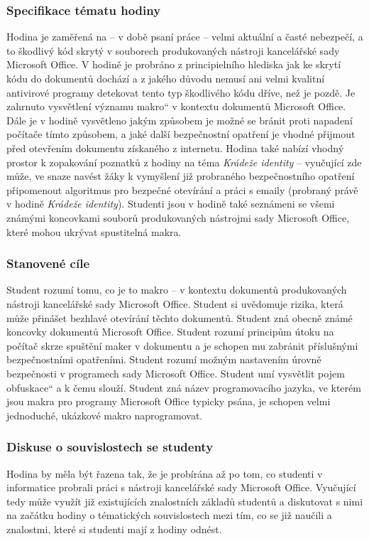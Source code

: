 \documentclass[a4paper, 12pt]{article}
\providecommand{\uv}[1]{\quotedblbase #1\textquotedblleft}
\begin{document}
\subsubsection{Specifikace tématu hodiny}
Hodina je zaměřená na -- v době psaní práce -- velmi aktuální a časté nebezpečí, a to škodlivý kód skrytý v souborech produkovaných nástroji kancelářské sady Microsoft Office. V hodině je probráno z principielního hlediska jak ke skrytí kódu do dokumentů dochází a z jakého důvodu nemusí ani velmi kvalitní antivirové programy detekovat tento typ škodlivého kódu dříve, než je pozdě. Je zahrnuto vysvětlení významu \uv{makro} v kontextu dokumentů Microsoft Office. Dále je v hodině vysvětleno jakým způsobem je možné se bránit proti napadení počítače tímto způsobem, a jaké další bezpečnostní opatření je vhodné přijmout před otevřením dokumentu získaného z internetu. Hodina také nabízí vhodný prostor k zopakování poznatků z hodiny na téma \textit{Krádeže identity} -- vyučující zde může, ve snaze navést žáky k vymyšlení již probraného bezpečnostního opatření připomenout algoritmus pro bezpečné otevírání a práci s emaily (probraný právě v hodině \textit{Krádeže identity}). Studenti jsou v hodině také seznámeni se všemi známými koncovkami souborů produkovaných nástrojmi sady Microsoft Office, které mohou ukrývat spustitelná makra. 

\subsubsection{Stanovené cíle}
Student rozumí tomu, co je to makro -- v kontextu dokumentů produkovaných nástroji kancelářské sady Microsoft Office. Student si uvědomuje rizika, která může přinášet bezhlavé otevírání těchto dokumentů. Student zná obecně známé koncovky dokumentů Microsoft Office. Student rozumí principům útoku na počítač skrze spuštění maker v dokumentu a je schopen mu zabránit příslušnými bezpečnostními opatřeními. Student rozumí možným nastavením úrovně bezpečnosti v programech sady Microsoft Office. Student umí vysvětlit pojem \uv{obfuskace} a k čemu slouží. Student zná název programovacího jazyka, ve kterém jsou makra pro programy Microsoft Office typicky psána, je schopen velmi jednoduché, ukázkové makro naprogramovat. 

\subsubsection{Diskuse o souvislostech se studenty}
Hodina by měla být řazena tak, že je probírána až po tom, co studenti v informatice probrali práci s nástroji kancelářské sady Microsoft Office. Vyučující tedy může využít již existujících znalostních základů studentů a diskutovat s nimi na začátku hodiny o tématických souvislostech mezi tím, co se již naučili a znalostmi, které si studenti mají z hodiny odnést. 
\end{document}
